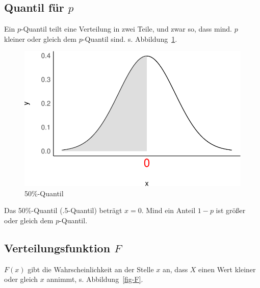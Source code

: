 \documentclass[
  a4paper,
  DIV=11]{scrreprt}
\theoremstyle{definition}
\theoremstyle{remark}
\begin{document}
\hypertarget{quantil-fuxfcr-p}{%
\subsection{\texorpdfstring{Quantil für
\(p\)}{Quantil für p}}\label{quantil-fuxfcr-p}}

Ein \(p\)-Quantil teilt eine Verteilung in zwei Teile, und zwar so, dass
mind. \(p\) kleiner oder gleich dem \(p\)-Quantil sind. s.
Abbildung~\ref{fig-quantil}.

\begin{figure}

{\centering \includegraphics{./abschluss_files/figure-pdf/fig-quantil-1.pdf}

}

\caption{\label{fig-quantil}50\%-Quantil}

\end{figure}

Das 50\%-Quantil (.5-Quantil) beträgt \(x=0\). Mind ein Anteil \(1-p\)
ist größer oder gleich dem \(p\)-Quantil.

\hypertarget{verteilungsfunktion-f}{%
\subsection{\texorpdfstring{Verteilungsfunktion
\(F\)}{Verteilungsfunktion F}}\label{verteilungsfunktion-f}}

\(F(x)\) gibt die Wahrscheinlichkeit an der Stelle \(x\) an, dass \(X\)
einen Wert kleiner oder gleich \(x\) annimmt, s. Abbildung~\ref{fig-F}.
\end{document}
